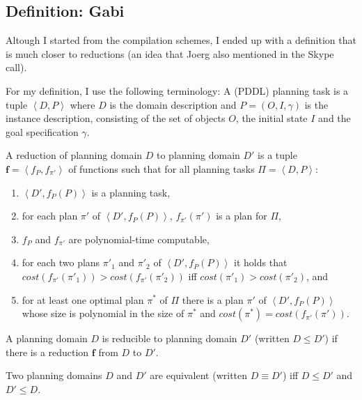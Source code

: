 

\subsection{Definition: Gabi}
\label{definition-gabi}

Altough I started from the compilation schemes, I ended up with a definition
that is much closer to reductions (an idea that Joerg also mentioned in the
Skype call).

For my definition, I use the following terminology:
A (PDDL) planning task is a tuple $\left<D, P\right>$
where $D$ is the domain description and $P=(O,I,\gamma)$ 
is the instance description, consisting of the set of objects $O$, the
initial state $I$ and the goal specification $\gamma$. 

\begin{theorem}[Reduction]
A reduction of planning domain $D$ to planning domain $D'$ is a tuple
$\mathbf f=\left<f_P, f_{\pi'}\right>$ of functions
such that for all planning tasks $\Pi = \left<D, P\right>$:
\begin{enumerate}
    \item $\left<D', f_P(P)\right>$ is a planning task,
    \item for each plan $\pi'$ of $\left<D', f_P(P)\right>$, $f_{\pi'}(\pi')$ is
          a plan for $\Pi$,
    \item $f_P$ and $f_{\pi'}$ are polynomial-time computable,
    \item for each two plans $\pi'_1$ and $\pi'_2$ of $\left<D', f_P(P)\right>$
          it holds that $\textit{cost}(f_{\pi'}(\pi'_1)) >
          \textit{cost}(f_{\pi'}(\pi'_2))$ iff $\textit{cost}(\pi'_1) >
          \textit{cost}(\pi'_2)$, and
    \item for at least one optimal plan $\pi^*$ of $\Pi$ there is a
          plan $\pi'$ of $\left<D', f_P(P)\right>$
          whose size is polynomial in the size of $\pi^*$ and
          $\textit{cost}(\pi^*) = \textit{cost}(f_{\pi'}(\pi'))$.
\end{enumerate}
\end{theorem}

\begin{theorem}[Reducibility]
A planning domain $D$ is reducible to planning domain $D'$ (written $D\leq D'$)
if there is a reduction $\mathbf f$ from $D$ to $D'$.
\end{theorem}

\begin{theorem}
Two planning domains $D$ and $D'$ are equivalent (written $D\equiv D'$) iff
$D\leq D'$ and $D'\leq D$.
\end{theorem}

